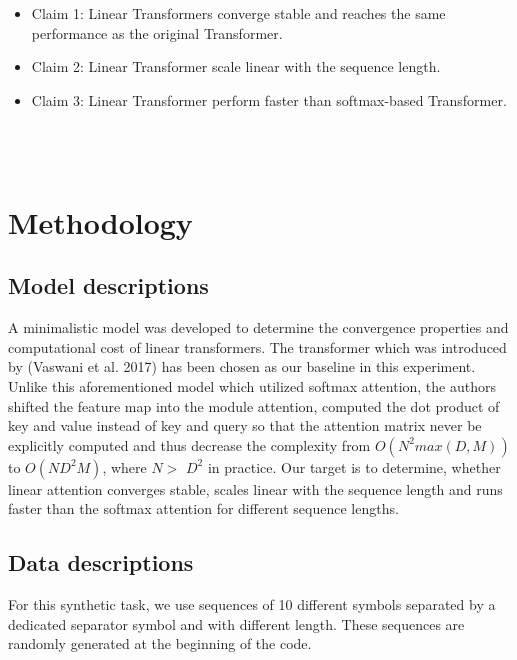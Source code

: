 \documentclass[DIV=13,fontsize=11pt]{scrartcl}
\begin{document}
\begin{itemize}
    \item Claim 1: Linear Transformers converge stable and reaches the same performance as the original Transformer.
    \item Claim 2: Linear Transformer scale linear with the sequence length.
    \item Claim 3: Linear Transformer perform faster than softmax-based Transformer.
\end{itemize} \\

\\ \section{Methodology}


\subsection{Model descriptions}
A minimalistic model was developed to determine the convergence properties and computational cost of linear transformers. The transformer which was introduced by (Vaswani et al. 2017) has been chosen as our baseline in this experiment. Unlike this aforementioned model which utilized softmax attention, the authors shifted the feature map into the module attention, computed the dot product of key and value instead of key and query so that the attention matrix never be explicitly computed and thus decrease the complexity from \(O(N^2 max(D,M))\) to \(O(ND^2M)\), where \(N >\) \(D^2\) in practice. Our target is to determine, whether linear attention converges stable, scales linear with the sequence length and runs faster than the softmax attention for different sequence lengths.

\subsection{Data descriptions}
For this synthetic task, we use sequences of 10 different symbols separated by a dedicated separator symbol and with different length. These sequences are randomly generated at the beginning of the code.
\end{document}
